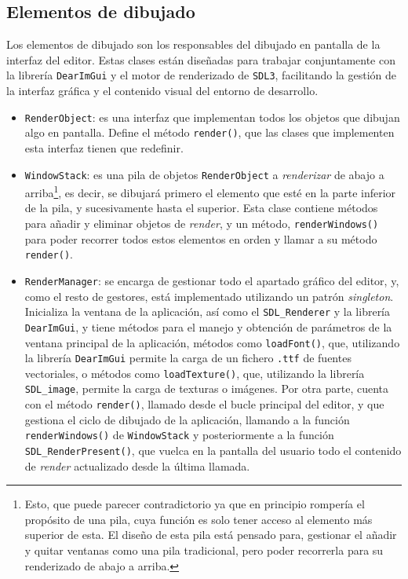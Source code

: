 \subsection{Elementos de dibujado}
\label{subsec:dibujado}
Los elementos de dibujado son los responsables del dibujado en pantalla de la interfaz del editor. Estas clases están diseñadas para trabajar conjuntamente con la librería \texttt{DearImGui} y el motor de renderizado de \texttt{SDL3}, facilitando la gestión de la interfaz gráfica y el contenido visual del entorno de desarrollo.

\begin{itemize}
	\item \texttt{RenderObject}: es una interfaz que implementan todos los objetos que dibujan algo en pantalla. Define el método \texttt{render()}, que las clases que implementen esta interfaz tienen que redefinir.
	\item \texttt{WindowStack}: es una pila de objetos \texttt{RenderObject} a \textit{renderizar} de abajo a arriba\footnote{Esto, que puede parecer contradictorio ya que en principio rompería el propósito de una pila, cuya función es solo tener acceso al elemento más superior de esta. El diseño de esta pila está pensado para, gestionar el añadir y quitar ventanas como una pila tradicional, pero poder recorrerla para su renderizado de abajo a arriba.}, es decir, se dibujará primero el elemento que esté en la parte inferior de la pila, y sucesivamente hasta el superior. Esta clase contiene métodos para añadir y eliminar objetos de \textit{render}, y un método, \texttt{renderWindows()} para poder recorrer todos estos elementos en orden y llamar a su método \texttt{render()}.
	\item \texttt{RenderManager}: se encarga de gestionar todo el apartado gráfico del editor, y, como el resto de gestores, está implementado utilizando un patrón \textit{singleton}. Inicializa la ventana de la aplicación, así como el \texttt{SDL\_Renderer} y la librería \texttt{DearImGui}, y tiene métodos para el manejo y obtención de parámetros de la ventana principal de la aplicación, métodos como \texttt{loadFont()}, que, utilizando la librería \texttt{DearImGui} permite la carga de un fichero \texttt{.ttf} de fuentes vectoriales, o métodos como \texttt{loadTexture()}, que, utilizando la librería \texttt{SDL\_image}, permite la carga de texturas o imágenes. Por otra parte, cuenta con el método \texttt{render()}, llamado desde el bucle principal del editor, y que gestiona el ciclo de dibujado de la aplicación, llamando a la función \texttt{renderWindows()} de \texttt{WindowStack} y posteriormente a la función \texttt{SDL\_RenderPresent()}, que vuelca en la pantalla del usuario todo el contenido de \textit{render} actualizado desde la última llamada. 

\end{itemize}
